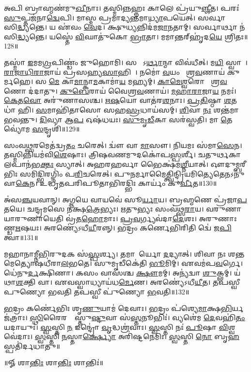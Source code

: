 𑌅𑌪𑌿 𑌬𑍍𑌰𑌾𑌹𑍍𑌮𑌣॑𑌮𑍁\ul{𑌖𑍀}𑌨𑌾𑌃। 𑌤𑌸𑍍𑌮𑌿𑌨𑍍𑌨𑌹𑍍𑌨𑌃 𑌕𑌾𑌲𑍇 𑌪𑍍𑌰॑𑌯𑍁\ul{𑌞𑍍𑌜𑍀}𑌤। 
𑌪𑌰𑌃॑ \ul{𑌸𑍁}𑌪𑍍𑌤𑌜॑𑌨𑌾\ul{𑌦𑍍𑌵𑍇}𑌪𑌿। 𑌮𑌾𑌸𑍍𑌮 𑌪𑍍𑌰𑌮𑌾𑌦𑍍𑌯𑌨𑍍𑌤॑𑌮𑌾\ul{𑌧𑍍𑌯𑌾}𑌪𑌯𑍇𑌤𑍍‌। 
𑌸𑌰𑍍𑌵𑌾𑌰𑍍𑌥𑌾𑌃᳚ 𑌸𑌿\ul{𑌦𑍍𑌧𑍍𑌯}𑌨𑍍𑌤𑍇। 𑌯 𑌏॑𑌵𑌂 \ul{𑌵𑍇}𑌦। 
𑌕𑍍𑌷𑍁𑌧𑍍𑌯𑌨𑍍𑌨𑌿𑌦॑𑌮\ul{𑌜𑌾}𑌨𑌤𑌾𑌮𑍍‌। 𑌸𑌰𑍍𑌵𑌾𑌰𑍍𑌥𑌾 𑌨॑ 𑌸𑌿\ul{𑌦𑍍𑌧𑍍𑌯}𑌨𑍍𑌤𑍇। 
𑌯𑌸𑍍𑌤𑍇॑ \ul{𑌵𑌿}𑌘𑌾𑌤𑍁॑𑌕𑍋 \ul{𑌭𑍍𑌰𑌾}𑌤𑌾। 𑌮𑌮𑌾𑌨𑍍𑌤𑌰𑍍‌𑌹𑍃॑𑌦\ul{𑌯𑍇} 𑌶𑍍𑌰𑌿𑌤𑌃॥128॥


𑌤𑌸𑍍𑌮𑌾॑ \ul{𑌇}𑌮𑌮\ul{𑌗𑍍𑌰}𑌪𑌿𑌣𑍍𑌡𑌂॑ 𑌜𑍁𑌹𑍋𑌮𑌿। 𑌸 𑌮𑍇᳚𑌽\ul{𑌰𑍍𑌥𑌾}𑌨𑍍𑌮𑌾 𑌵𑌿𑌵॑𑌧𑍀𑌤𑍍‌। 
𑌮\ul{𑌯𑌿} 𑌸𑍍𑌵𑌾𑌹𑌾᳚। \ul{𑌰𑌾}\ul{𑌜𑌾}\ul{𑌧𑌿}\ul{𑌰𑌾}𑌜𑌾𑌯॑ 𑌪𑍍𑌰𑌸𑌹𑍍𑌯\ul{𑌸𑌾}𑌹𑌿𑌨𑍇᳚। 
𑌨𑌮𑍋॑ \ul{𑌵}𑌯𑌂 𑌵𑍈᳚𑌶𑍍𑌰\ul{𑌵}𑌣𑌾𑌯॑ 𑌕𑍁𑌰𑍍𑌮𑌹𑍇। 𑌸 \ul{𑌮𑍇} 𑌕𑌾\ul{𑌮𑌾}𑌨𑍍𑌕𑌾\ul{𑌮}𑌕𑌾𑌮𑌾॑\ul{𑌯} 𑌮𑌹𑍍𑌯𑌮𑍍‌᳚। 
\ul{𑌕𑌾}\ul{𑌮𑍇}\ul{𑌶𑍍𑌵}𑌰𑍋 𑌵𑍈᳚𑌶𑍍𑌰\ul{𑌵}𑌣𑍋 𑌦॑𑌦𑌾𑌤𑍁। \ul{𑌕𑍁}\ul{𑌬𑍇}𑌰𑌾𑌯॑ 𑌵𑍈𑌶𑍍𑌰\ul{𑌵}𑌣𑌾𑌯॑। 
\ul{𑌮}\ul{𑌹𑌾}\ul{𑌰𑌾}𑌜𑌾\ul{𑌯} 𑌨𑌮𑌃॑। \ul{𑌕𑍇}𑌤\ul{𑌵𑍋} 𑌅𑌰𑍁॑𑌣𑌾𑌸𑌶𑍍𑌚। 
\ul{𑌋}\ul{𑌷}𑌯𑍋 𑌵𑌾𑌤॑𑌰\ul{𑌶}𑌨𑌾𑌃। \ul{𑌪𑍍𑌰}\ul{𑌤𑌿}𑌷𑍍𑌠𑌾 \ul{𑌶}𑌤𑌧𑌾॑ 𑌹𑌿। 
\ul{𑌸}𑌮𑌾𑌹𑌿॑𑌤𑌾𑌸𑍋 𑌸𑌹\ul{𑌸𑍍𑌰}𑌧𑌾𑌯॑𑌸𑌮𑍍‌। \ul{𑌶𑌿}𑌵𑌾 \ul{𑌨𑌃} 𑌶𑌨𑍍𑌤॑𑌮𑌾 𑌭𑌵𑌨𑍍𑌤𑍁। 
\ul{𑌦𑌿}𑌵𑍍𑌯𑌾 𑌆\ul{𑌪} 𑌓𑌷॑𑌧𑌯𑌃। \ul{𑌸𑍁}\ul{𑌮𑍃}\ul{𑌡𑍀}𑌕𑌾 𑌸𑌰॑𑌸𑍍𑌵𑌤𑌿। 
𑌮𑌾 \ul{𑌤𑍇} 𑌵𑍍𑌯𑍋॑𑌮 \ul{𑌸}𑌨𑍍𑌦𑍃𑌶𑌿॑॥129॥\anuvakamend


𑌸𑌂𑌵𑌥𑍍𑌸𑌰𑌮𑍇𑌤॑𑌦𑍍𑌵𑍍𑌰\ul{𑌤𑌂} 𑌚𑌰𑍇𑌤𑍍‌। 𑌦𑍍𑌵𑍗॑ 𑌵𑌾 \ul{𑌮𑌾}𑌸𑍗। 
𑌨𑌿𑌯𑌮𑌃 𑌸॑𑌮𑌾\ul{𑌸𑍇}𑌨। 𑌤𑌸𑍍𑌮𑌿𑌨𑍍𑌨𑌿𑌯𑌮॑𑌵𑌿\ul{𑌶𑍇}𑌷𑌾𑌃। 
𑌤𑍍𑌰𑌿𑌷𑌵𑌣𑌮𑍁𑌦𑌕𑍋॑𑌪\ul{𑌸𑍍𑌪}𑌰𑍍𑌶𑍀। 𑌚𑌤𑍁𑌰𑍍𑌥𑌕𑌾𑌲𑌪𑌾𑌨॑𑌭\ul{𑌕𑍍𑌤𑌃} 𑌸𑍍𑌯𑌾𑌤𑍍‌। 
𑌅𑌹𑌰𑌹𑌰𑍍𑌵𑌾 𑌭𑍈𑌕𑍍𑌷॑𑌮\ul{𑌶𑍍𑌨𑍀}𑌯𑌾𑌤𑍍‌। 𑌔𑌦𑍁𑌮𑍍𑌬𑌰𑍀𑌭𑌿𑌃 𑌸𑌮𑌿𑌦𑍍𑌭𑌿𑌰𑌗𑍍𑌨𑌿𑌂॑ 𑌪\ul{𑌰𑌿}𑌚𑌰𑍇𑌤𑍍‌। 
𑌪𑍁𑌨𑌰𑍍𑌮𑌾𑌮𑍈𑌤𑍍𑌤𑍍𑌵𑌿𑌨𑍍𑌦𑍍𑌰𑌿𑌯𑌮𑌿\-𑌤𑍍𑌯𑍇𑌤𑍇𑌨𑌽𑌨𑍁॑𑌵𑌾\ul{𑌕𑍇}𑌨। 𑌉𑌦𑍍𑌧𑍃𑌤𑌪𑌰𑌿𑌪𑍂𑌤𑌾𑌭𑌿\-𑌰𑌦𑍍𑌭𑌿𑌃 𑌕𑌾𑌰𑍍𑌯𑌂॑ 𑌕𑍁\ul{𑌰𑍍𑌵𑍀}𑌤॥130॥


𑌅॑𑌸\ul{𑌞𑍍𑌚}𑌯𑌵𑌾𑌨𑍍‌। 𑌅𑌗𑍍𑌨𑌯𑍇 𑌵𑌾𑌯𑌵𑍇॑ 𑌸𑍂\ul{𑌰𑍍𑌯𑌾}𑌯। 
𑌬𑍍𑌰𑌹𑍍𑌮𑌣𑍇 𑌪𑍍𑌰॑𑌜𑌾\ul{𑌪}𑌤𑌯𑍇। 𑌚𑌨𑍍𑌦𑍍𑌰𑌮𑌸𑍇 𑌨॑𑌕𑍍𑌷\ul{𑌤𑍍𑌰𑍇}𑌭𑍍𑌯𑌃। 
𑌋𑌤𑍁𑌭𑍍𑌯𑌃 𑌸𑌂𑌵॑𑌥𑍍𑌸\ul{𑌰𑌾}𑌯। 𑌵𑌰𑍁𑌣𑌾𑌯𑌾𑌰𑍁𑌣𑌾𑌯𑍇𑌤𑌿 𑌵𑍍𑌰॑𑌤\ul{𑌹𑍋}𑌮𑌾𑌃। 
\ul{𑌪𑍍𑌰}\ul{𑌵}𑌰𑍍𑌗𑍍𑌯𑌵॑𑌦𑌾\ul{𑌦𑍇}𑌶𑌃। 𑌅𑌰𑍁𑌣𑌾𑌃 𑌕𑌾᳚𑌣𑍍𑌡\ul{𑌋}𑌷𑌯𑌃। 
𑌅𑌰𑌣𑍍𑌯𑍇॑𑌽𑌧𑍀\ul{𑌯𑍀}𑌰𑌨𑍍𑌨𑍍‌। 𑌭𑌦𑍍𑌰𑌂 𑌕𑌰𑍍𑌣𑍇𑌭𑌿𑌰𑌿𑌤𑌿 𑌦𑍍𑌵𑍇॑ 𑌜\ul{𑌪𑌿}𑌤𑍍𑌵𑌾॥131॥


𑌮𑌹𑌾𑌨𑌾𑌮𑍍𑌨𑍀𑌭𑌿𑌰𑍁𑌦𑌕 𑌸॑\ul{𑌸𑍍𑌪}𑌰𑍍𑌶𑍍𑌯। 𑌤𑌮𑌾𑌚𑌾᳚𑌰𑍍𑌯𑍋 \ul{𑌦}𑌦𑍍𑌯𑌾𑌤𑍍‌। 
𑌶𑌿𑌵𑌾 𑌨𑌃 𑌶𑌨𑍍𑌤𑌮𑍇𑌤𑍍𑌯𑍋𑌷𑌧𑍀॑𑌰𑌾\ul{𑌲}𑌭𑌤𑍇। 𑌸𑍁𑌮𑍃𑌡𑍀𑌕𑍇॑𑌤𑌿 \ul{𑌭𑍂}𑌮𑌿𑌮𑍍‌। 
𑌏𑌵𑌮॑𑌪\ul{𑌵}𑌰𑍍𑌗𑍇। 𑌧𑍇॑𑌨𑍁\ul{𑌰𑍍𑌦}𑌕𑍍𑌷𑌿𑌣𑌾। 𑌕𑌸𑌂 𑌵𑌾𑌸॑𑌶𑍍𑌚 \ul{𑌕𑍍𑌷𑍗}𑌮𑌮𑍍‌। 
𑌅𑌨𑍍𑌯॑𑌦𑍍𑌵𑌾 \ul{𑌶𑍁}𑌕𑍍𑌲𑌮𑍍‌। 𑌯॑𑌥𑌾\ul{𑌶}𑌕𑍍𑌤𑌿 𑌵𑌾। 𑌏𑌵𑌸𑍍𑌵𑌾𑌧𑍍𑌯𑌾𑌯॑𑌧\ul{𑌰𑍍𑌮𑍇}𑌣। 
𑌅𑌰𑌣𑍍𑌯𑍇॑𑌽𑌧𑍀\ul{𑌯𑍀}𑌤। 𑌤𑌪𑌸𑍍𑌵𑍀 𑌪𑍁𑌣𑍍𑌯𑍋 𑌭𑌵𑌤𑌿 𑌤𑌪𑌸𑍍𑌵𑍀 𑌪𑍁॑𑌣𑍍𑌯𑍋 \ul{𑌭}𑌵𑌤𑌿॥132॥\anuvakamend


\ul{𑌭}𑌦𑍍𑌰𑌂 𑌕𑌰𑍍𑌣𑍇॑𑌭𑌿𑌃 𑌶𑍃\ul{𑌣𑍁}𑌯𑌾𑌮॑ 𑌦𑍇𑌵𑌾𑌃। \ul{𑌭}𑌦𑍍𑌰𑌂 𑌪॑𑌶𑍍𑌯𑍇\ul{𑌮𑌾}𑌕𑍍𑌷\ul{𑌭𑌿}𑌰𑍍𑌯𑌜॑𑌤𑍍𑌰𑌾𑌃। 
\ul{𑌸𑍍𑌥𑌿}𑌰𑍈𑌰𑌙𑍍𑌗𑍈᳚𑌸𑍍𑌤𑍁\ul{𑌷𑍍𑌟𑍁}𑌵𑌾 𑌸॑\ul{𑌸𑍍𑌤}𑌨𑍂𑌭𑌿𑌃॑। 𑌵𑍍𑌯𑌶𑍇॑𑌮 \ul{𑌦𑍇}𑌵𑌹𑌿॑\ul{𑌤𑌂} 𑌯𑌦𑌾𑌯𑍁𑌃॑। 
\ul{𑌸𑍍𑌵}𑌸𑍍𑌤𑌿 \ul{𑌨} 𑌇𑌨𑍍𑌦𑍍𑌰𑍋॑ \ul{𑌵𑍃}𑌦𑍍𑌧𑌶𑍍𑌰॑𑌵𑌾𑌃। \ul{𑌸𑍍𑌵}𑌸𑍍𑌤𑌿 𑌨𑌃॑ \ul{𑌪𑍂}𑌷𑌾 \ul{𑌵𑌿}𑌶𑍍𑌵𑌵𑍇॑𑌦𑌾𑌃। 
\ul{𑌸𑍍𑌵}𑌸𑍍𑌤𑌿 \ul{𑌨}𑌸𑍍𑌤𑌾\ul{𑌰𑍍𑌕𑍍𑌷𑍍𑌯𑍋} 𑌅𑌰𑌿॑𑌷𑍍𑌟𑌨𑍇𑌮𑌿𑌃। \ul{𑌸𑍍𑌵}𑌸𑍍𑌤𑌿 \ul{𑌨𑍋} 𑌬𑍃\ul{𑌹}𑌸𑍍𑌪𑌤𑌿॑𑌰𑍍𑌦𑌧𑌾𑌤𑍁॥\\

\centerline{॥𑍐 𑌶𑌾\ul{𑌨𑍍𑌤𑌿𑌃} 𑌶𑌾\ul{𑌨𑍍𑌤𑌿𑌃} 𑌶𑌾𑌨𑍍𑌤𑌿𑌃॑॥}
